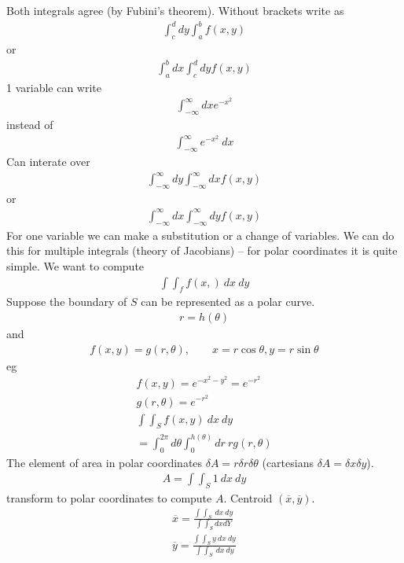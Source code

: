 Both integrals agree (by Fubini's theorem).
Without brackets write as 
\begin{align*}
\int_c^d dy \int_a^b f(x,y)
\end{align*}
or
\begin{align*}
\int_a^b dx \int_c^d dy f(x,y)
\end{align*}
1 variable can write
\begin{align*}
\int_{-\infty}^{\infty} dx e^{-x^2}
\end{align*}
instead of
\begin{align*}
\int_{-\infty}^{\infty} e^{-x^2} ~dx
\end{align*}
Can interate over
\begin{align*}
\int_{-\infty}^{\infty} dy \int_{-\infty}^{\infty} dx f(x,y)
\end{align*}
or
\begin{align*}
\int_{-\infty}^{\infty} dx \int_{-\infty}^{\infty} dy f(x,y)
\end{align*}
For one variable we can make a substitution or a change of variables. We can do this for multiple integrals (theory of Jacobians) -- for polar coordinates  it is quite simple. We want to compute
\begin{align*}
\int \int_f f(x,) ~dx~dy
\end{align*}
Suppose the boundary of $S$ can be represented as a polar curve.
\begin{align*}
r= h(\theta)
\end{align*}
and
\begin{align*}
f(x,y) = g(r,\theta), \qquad x = r \cos \theta, y = r \sin \theta 
\end{align*}
eg
\begin{align*}
f(x,y) = e^{-x^2-y^2} = e^{-r^2} \\
g(r, \theta) = e^{-r^2} \\
\int \int_S f(x,y) ~dx~dy \\
= \int_0^{2 \pi} d \theta \int_0^{h(\theta)} dr~ r g(r,\theta)
\end{align*}
The element of area in polar coordinates $\delta A = r \delta r \delta \theta$ (cartesians $\delta A = \delta x \delta y$).
\begin{align*}
A = \int \int_S 1 ~dx~dy
\end{align*}
transform to polar coordinates to compute $A$. 
Centroid $(\overline x, \overline y)$.
\begin{align*}
\overline x = \frac{\int \int_S ~dx ~dy}{\int \int_S dx dY} \\
\overline y = \frac{\int \int _S y ~dx ~dy}{\int\int_S ~dx~dy}
\end{align*}










